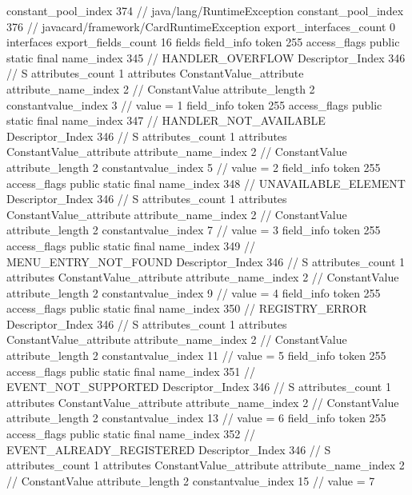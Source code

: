 {{{{				constant_pool_index	374		// java/lang/RuntimeException
				constant_pool_index	376		// javacard/framework/CardRuntimeException
			}
			export_interfaces_count	0
			interfaces {
			}
			export_fields_count	16
			fields {
			field_info {
				token	255
				access_flags	public static final
				name_index	345		// HANDLER_OVERFLOW
				Descriptor_Index	346		// S
				attributes_count	1
				attributes {
				ConstantValue_attribute {
					attribute_name_index	2		// ConstantValue
					attribute_length	2
					constantvalue_index	3		// value = 1
				}
				}
			}
			field_info {
				token	255
				access_flags	public static final
				name_index	347		// HANDLER_NOT_AVAILABLE
				Descriptor_Index	346		// S
				attributes_count	1
				attributes {
				ConstantValue_attribute {
					attribute_name_index	2		// ConstantValue
					attribute_length	2
					constantvalue_index	5		// value = 2
				}
				}
			}
			field_info {
				token	255
				access_flags	public static final
				name_index	348		// UNAVAILABLE_ELEMENT
				Descriptor_Index	346		// S
				attributes_count	1
				attributes {
				ConstantValue_attribute {
					attribute_name_index	2		// ConstantValue
					attribute_length	2
					constantvalue_index	7		// value = 3
				}
				}
			}
			field_info {
				token	255
				access_flags	public static final
				name_index	349		// MENU_ENTRY_NOT_FOUND
				Descriptor_Index	346		// S
				attributes_count	1
				attributes {
				ConstantValue_attribute {
					attribute_name_index	2		// ConstantValue
					attribute_length	2
					constantvalue_index	9		// value = 4
				}
				}
			}
			field_info {
				token	255
				access_flags	public static final
				name_index	350		// REGISTRY_ERROR
				Descriptor_Index	346		// S
				attributes_count	1
				attributes {
				ConstantValue_attribute {
					attribute_name_index	2		// ConstantValue
					attribute_length	2
					constantvalue_index	11		// value = 5
				}
				}
			}
			field_info {
				token	255
				access_flags	public static final
				name_index	351		// EVENT_NOT_SUPPORTED
				Descriptor_Index	346		// S
				attributes_count	1
				attributes {
				ConstantValue_attribute {
					attribute_name_index	2		// ConstantValue
					attribute_length	2
					constantvalue_index	13		// value = 6
				}
				}
			}
			field_info {
				token	255
				access_flags	public static final
				name_index	352		// EVENT_ALREADY_REGISTERED
				Descriptor_Index	346		// S
				attributes_count	1
				attributes {
				ConstantValue_attribute {
					attribute_name_index	2		// ConstantValue
					attribute_length	2
					constantvalue_index	15		// value = 7
				}
				}
			}
}}}}
